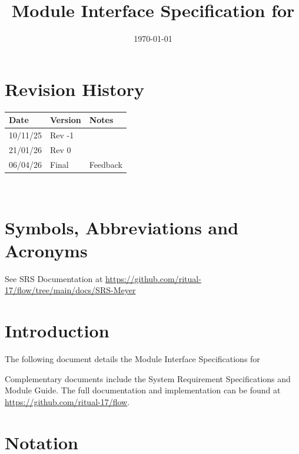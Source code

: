 \documentclass[12pt, titlepage]{article}
\begin{document}
\title{Module Interface Specification for \progname{}}

\author{\authname}

\date{\today}

\maketitle


\section{Revision History}

\begin{tabularx}{\textwidth}{p{3cm}p{2cm}X}
\toprule {\bf Date} & {\bf Version} & {\bf Notes}\\
\midrule
10/11/25 & Rev -1 & \\
21/01/26 & Rev 0 & \\
06/04/26 & Final & Feedback\\
\bottomrule
\end{tabularx}

~\newpage

\section{Symbols, Abbreviations and Acronyms}

See SRS Documentation at \url{https://github.com/ritual-17/flow/tree/main/docs/SRS-Meyer}


\newpage

\tableofcontents

\newpage


\section{Introduction}

The following document details the Module Interface Specifications for
\progname{}

Complementary documents include the System Requirement Specifications
and Module Guide.  The full documentation and implementation can be
found at \url{https://github.com/ritual-17/flow}.

\section{Notation}
\end{document}
